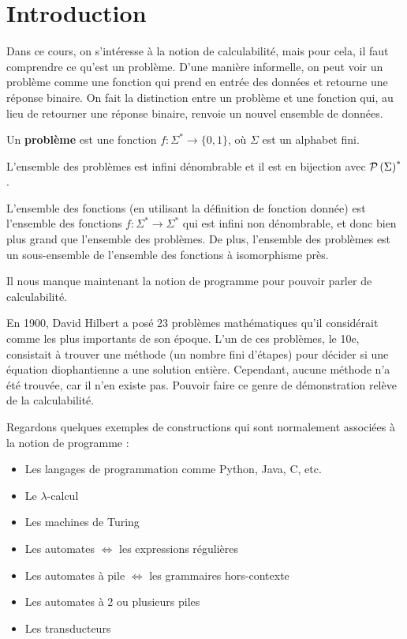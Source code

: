 
\section{Introduction}


Dans ce cours, on s'intéresse à la notion de calculabilité, mais pour cela, il faut comprendre ce qu'est un problème.
D'une manière informelle, on peut voir un problème comme une fonction qui prend en entrée des données et retourne une réponse binaire.
On fait la distinction entre un problème et une fonction qui, au lieu de retourner une réponse binaire, renvoie un nouvel ensemble de données.
\begin{definition}
	Un \textbf{problème} est une fonction $f: \Sigma^* \to \{0, 1\}$, où $\Sigma$ est un alphabet fini.
\end{definition}

\begin{remarque}
	L'ensemble des problèmes est infini dénombrable et il est en bijection avec $\mathcal{P}\left(\Sigma\right)^*$.
\end{remarque}

\begin{remarque}
	L'ensemble des fonctions (en utilisant la définition de fonction donnée) est l'ensemble des fonctions $f: \Sigma^* \to \Sigma^*$ qui est infini non dénombrable,
	et donc bien plus grand que l'ensemble des problèmes. De plus, l'ensemble des problèmes est un sous-ensemble de l'ensemble des fonctions à isomorphisme près.
\end{remarque}

Il nous manque maintenant la notion de programme pour pouvoir parler de calculabilité.

En 1900, David Hilbert a posé 23 problèmes mathématiques qu'il considérait comme les plus importants de son époque. L'un de ces problèmes, le 10e, consistait à trouver
une méthode (un nombre fini d'étapes) pour décider si une équation diophantienne a une solution entière. Cependant, aucune méthode n'a été trouvée, car il n'en existe pas.
Pouvoir faire ce genre de démonstration relève de la calculabilité.

Regardons quelques exemples de constructions qui sont normalement associées à la notion de programme :

\begin{itemize}
	\item Les langages de programmation comme Python, Java, C, etc. 
	\item Le $\lambda$-calcul 
	\item Les machines de Turing 
	\item Les automates $\iff$ les expressions régulières 
	\item Les automates à pile $\iff$ les grammaires hors-contexte 
	\item Les automates à 2 ou plusieurs piles 
	\item Les transducteurs
\end{itemize}

